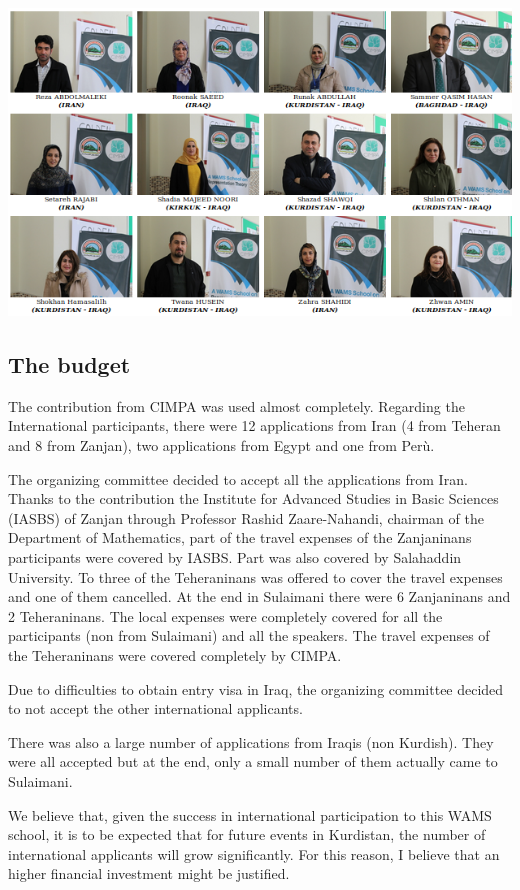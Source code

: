 \documentclass[12pt,a4paper]{scrartcl}
\begin{document}
\centerline{\includegraphics[width=18cm]{trombino4.png}}


\subsection*{The budget}

The contribution from CIMPA was used almost completely. Regarding the International
participants, there were 12 applications from Iran (4 from Teheran and 8 from Zanjan), two applications
from Egypt and one from Per\`u.

The organizing committee decided to accept all the applications from Iran. Thanks to the contribution the Institute for Advanced Studies in Basic Sciences (IASBS) of Zanjan through Professor
Rashid Zaare-Nahandi, chairman of the Department of Mathematics, part of the travel expenses of the Zanjaninans
participants were covered by IASBS. Part was also covered by Salahaddin University. To three of the Teheraninans was offered to cover the travel expenses and
one of them cancelled. At the end in Sulaimani there were 6 Zanjaninans and 2 Teheraninans. The local expenses
were completely covered for all the participants (non from Sulaimani) and all the speakers. The travel expenses of the Teheraninans were covered completely by CIMPA.

Due to difficulties to obtain entry visa in Iraq, the organizing committee decided to not accept the other international applicants.

There was also a large number of applications from Iraqis (non Kurdish). They were all accepted but at the end, only a small number of them actually came to Sulaimani.

We believe that, given the success in international participation to this WAMS school, it is to be expected
that for future events in Kurdistan, the number of international applicants will grow significantly. For this reason, I believe that an higher financial investment might be justified. 
\end{document}
